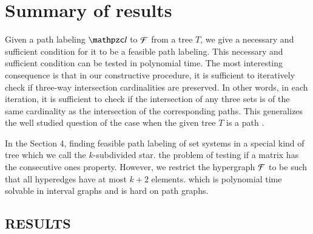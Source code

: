 \documentclass[MS,]{iitmdiss}
\begin{document}
\chapter{Summary of results}
\label{chap:results}

Given a path labeling $\cl$ to ${\cal F}$ from a tree $T$, we give a
necessary and sufficient condition for it to be a feasible path
labeling.  This necessary and sufficient condition can be tested in
polynomial time.  The most interesting consequence is that in our
constructive procedure, it is sufficient to iteratively check if
three-way intersection cardinalities are preserved.  In other words,
in each iteration, it is sufficient to check if the intersection of
any three sets is of the same cardinality as the intersection of the
corresponding paths.  This generalizes the well studied question of
the case when the given tree $T$ is a path \cite{wlh02,nsnrs09}.

In the Section 4, 
finding feasible path labeling of set systems in a special kind of
tree which we call the $k$-subdivided star.   the problem of testing if a
matrix has the consecutive ones property.  However, we restrict the
hypergraph ${\cal F}$ to be such that all hyperedges have at most $k+2$
elements.   which is
polynomial time solvable in interval graphs and is hard on path
graphs.



\section{RESULTS}
\end{document}
